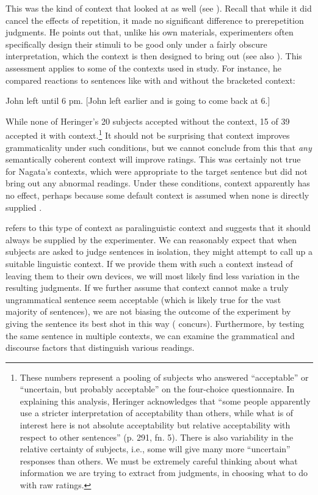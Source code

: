This was the kind of context that \citet{Nagata1988} looked at as well (see ). Recall that while it did cancel the effects of repetition, it made no significant difference to prerepetition judgments. He points out that, unlike his own materials, experimenters often specifically design their stimuli to be good only under a fairly obscure interpretation, which the context is then designed to bring out (see also \citet{GleitmanEtAl1970}). This assessment applies to some of the contexts used in  study. For instance, he compared reactions to sentences like  with and without the bracketed context:

\ea\label{ex:5:6}
John left until 6 pm. [John left earlier and is going to come back at 6.]
\z

\noindent
While none of Heringer's 20 subjects accepted  without the context, 15 of 39 accepted it with context.\footnote{These numbers represent a pooling of subjects who answered ``acceptable'' or ``uncertain, but probably acceptable'' on the four-choice questionnaire. In explaining this analysis, Heringer acknowledges that ``some people apparently use a stricter interpretation of acceptability than others, while what is of interest here is not absolute acceptability but relative acceptability with respect to other sentences'' (p. 291, fn. 5). There is also variability in the relative certainty of subjects, i.e., some will give many more ``uncertain'' responses than others. We must be extremely careful thinking about what information we are trying to extract from judgments, in choosing what to do with raw ratings.}
 It should not be surprising that context improves grammaticality under such conditions, but we cannot conclude from this that \textit{any} semantically coherent context will improve ratings. This was certainly not true for Nagata's contexts, which were appropriate to the target sentence but did not bring out any abnormal readings. Under these conditions, context apparently has no effect, perhaps because some default context is assumed when none is directly supplied \citep{DanksEtAl1971}.



\citet{Snow1975} refers to this type of context as paralinguistic context and suggests that it should always be supplied by the experimenter. We can reasonably expect that when subjects are asked to judge sentences in isolation, they might attempt to call up a suitable linguistic context. If we provide them with such a context instead of leaving them to their own devices, we will most likely find less variation in the resulting judgments. If we further assume that context cannot make a truly ungrammatical sentence seem acceptable (which is likely true for the vast majority of sentences), we are not biasing the outcome of the experiment by giving the sentence its best shot in this way (\citet{Householder1973} concurs). Furthermore, by testing the same sentence in multiple contexts, we can examine the grammatical and discourse factors that distinguish various readings.

